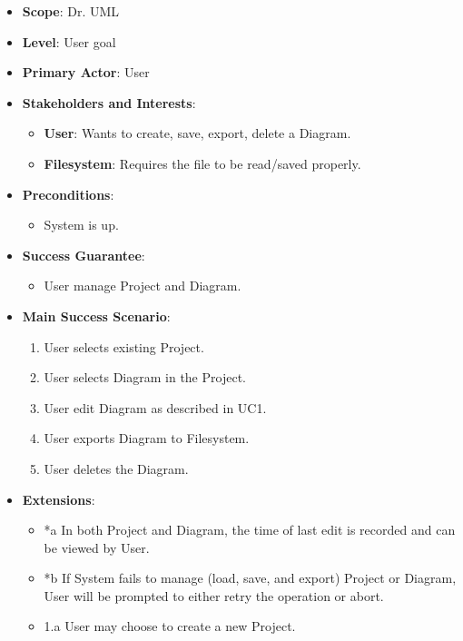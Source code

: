 \documentclass[12pt]{article}
\begin{document}
    \begin{itemize}
        \item \textbf{Scope}: Dr. UML
        \item \textbf{Level}: User goal
        \item \textbf{Primary Actor}: User
        \item \textbf{Stakeholders and Interests}:
        \begin{itemize}
            \item \textbf{User}: Wants to create, save, export, delete a Diagram.
            \item \textbf{Filesystem}: Requires the file to be read/saved properly.
        \end{itemize}
        \item \textbf{Preconditions}:
        \begin{itemize}
            \item System is up.
        \end{itemize}
        \item \textbf{Success Guarantee}:
        \begin{itemize}
            \item User manage Project and Diagram.
        \end{itemize}
        \item \textbf{Main Success Scenario}:
        \begin{enumerate}
            \item User selects existing Project.
            \item User selects Diagram in the Project.
            \item User edit Diagram as described in UC1.
            \item User exports Diagram to Filesystem.
            \item User deletes the Diagram.
        \end{enumerate}
        \item \textbf{Extensions}:
        \begin{itemize}
            \item *a In both Project and Diagram, the time of last edit is recorded and can be viewed by User.
            \item *b If System fails to manage (load, save, and export) Project or Diagram, User will be prompted to either retry the operation or abort.
            \item 1.a User may choose to create a new Project.

\end{itemize}
\end{itemize}
\end{document}
